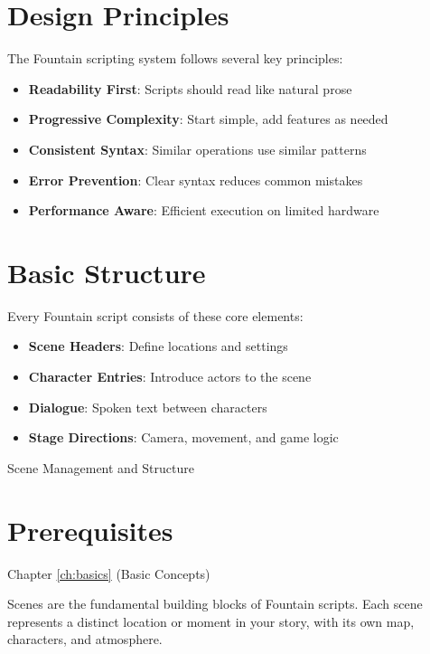 \documentclass[11pt,letterpaper,oldstylefigures]{memoir}
\makeatletter
\let\oldchapter\chapter
\def\chapter{%
  \@ifstar
    {\FountainScripting@starchapter}%
    {\@dblarg\FountainScripting@chapter}}
\def\FountainScripting@starchapter#1{\oldchapter*{#1}\chaptermark{#1}}
\def\FountainScripting@chapter[#1]#2{\oldchapter[#1]{#2}\chaptermark{#2}}
\newcommand{\sectionbreak}{\newpage}
\makeatother
\begin{document}
\section{Design Principles}
The Fountain scripting system follows several key principles:
\begin{itemize}
\item \textbf{Readability First}: Scripts should read like natural prose
\item \textbf{Progressive Complexity}: Start simple, add features as needed
\item \textbf{Consistent Syntax}: Similar operations use similar patterns
\item \textbf{Error Prevention}: Clear syntax reduces common mistakes
\item \textbf{Performance Aware}: Efficient execution on limited hardware
\end{itemize}

\section{Basic Structure}

Every Fountain script consists of these core elements:

\begin{itemize}
\item \textbf{Scene Headers}: Define locations and settings
\item \textbf{Character Entries}: Introduce actors to the scene
\item \textbf{Dialogue}: Spoken text between characters
\item \textbf{Stage Directions}: Camera, movement, and game logic
\end{itemize}

\chapter{Scene Management and Structure}
\label{ch:scene-management}
\sectionbreak

\section{Prerequisites}
Chapter \ref{ch:basics} (Basic Concepts)

Scenes are the fundamental building blocks of Fountain scripts. Each scene represents a distinct location or moment in your story, with its own map, characters, and atmosphere.
\end{document}

